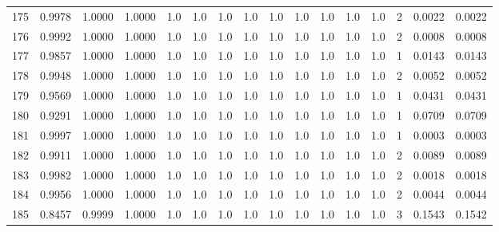 \begin{tabular}{lrrrrrrrrrrrrrrr}
175 &      0.9978 &  1.0000 &  1.0000 &     1.0 &     1.0 &     1.0 &     1.0 &     1.0 &     1.0 &     1.0 &      1.0 &        1.0 &      2 &                    0.0022 &                     0.0022 \\
176 &      0.9992 &  1.0000 &  1.0000 &     1.0 &     1.0 &     1.0 &     1.0 &     1.0 &     1.0 &     1.0 &      1.0 &        1.0 &      2 &                    0.0008 &                     0.0008 \\
177 &      0.9857 &  1.0000 &  1.0000 &     1.0 &     1.0 &     1.0 &     1.0 &     1.0 &     1.0 &     1.0 &      1.0 &        1.0 &      1 &                    0.0143 &                     0.0143 \\
178 &      0.9948 &  1.0000 &  1.0000 &     1.0 &     1.0 &     1.0 &     1.0 &     1.0 &     1.0 &     1.0 &      1.0 &        1.0 &      2 &                    0.0052 &                     0.0052 \\
179 &      0.9569 &  1.0000 &  1.0000 &     1.0 &     1.0 &     1.0 &     1.0 &     1.0 &     1.0 &     1.0 &      1.0 &        1.0 &      1 &                    0.0431 &                     0.0431 \\
180 &      0.9291 &  1.0000 &  1.0000 &     1.0 &     1.0 &     1.0 &     1.0 &     1.0 &     1.0 &     1.0 &      1.0 &        1.0 &      1 &                    0.0709 &                     0.0709 \\
181 &      0.9997 &  1.0000 &  1.0000 &     1.0 &     1.0 &     1.0 &     1.0 &     1.0 &     1.0 &     1.0 &      1.0 &        1.0 &      1 &                    0.0003 &                     0.0003 \\
182 &      0.9911 &  1.0000 &  1.0000 &     1.0 &     1.0 &     1.0 &     1.0 &     1.0 &     1.0 &     1.0 &      1.0 &        1.0 &      2 &                    0.0089 &                     0.0089 \\
183 &      0.9982 &  1.0000 &  1.0000 &     1.0 &     1.0 &     1.0 &     1.0 &     1.0 &     1.0 &     1.0 &      1.0 &        1.0 &      2 &                    0.0018 &                     0.0018 \\
184 &      0.9956 &  1.0000 &  1.0000 &     1.0 &     1.0 &     1.0 &     1.0 &     1.0 &     1.0 &     1.0 &      1.0 &        1.0 &      2 &                    0.0044 &                     0.0044 \\
185 &      0.8457 &  0.9999 &  1.0000 &     1.0 &     1.0 &     1.0 &     1.0 &     1.0 &     1.0 &     1.0 &      1.0 &        1.0 &      3 &                    0.1543 &                     0.1542 \\

\end{tabular}
